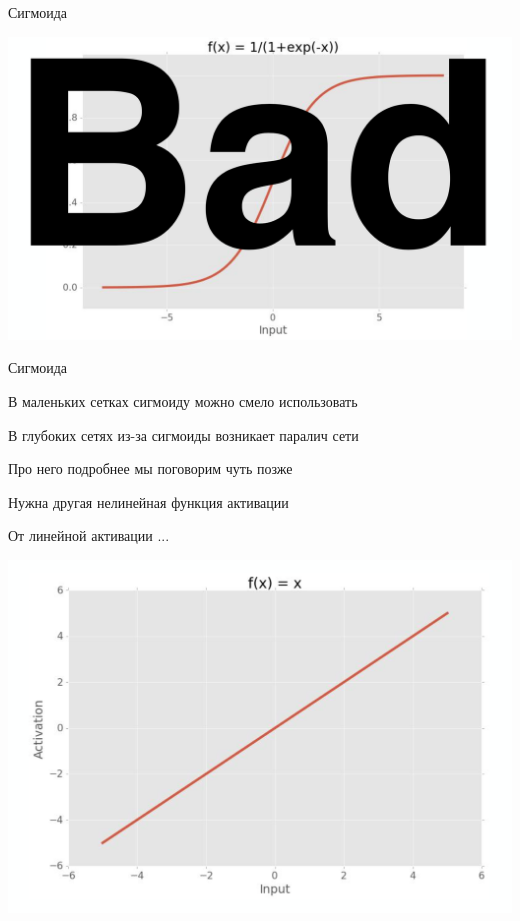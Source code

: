 \documentclass[notes,12pt, aspectratio=169]{beamer}
\newenvironment{wideitemize}{\itemize\addtolength{\itemsep}{10pt}}{\enditemize}
\begin{document}
\begin{frame}{Сигмоида}
\begin{center}
	\includegraphics[width=0.7\paperwidth]{activation_3.png}
\end{center}
\end{frame}


\begin{frame}{Сигмоида}
\begin{wideitemize}
	\item В маленьких сетках сигмоиду можно смело использовать
	\item В глубоких сетях из-за сигмоиды возникает \alert{паралич сети} 
	\item Про него подробнее мы поговорим чуть позже 
	\item Нужна другая нелинейная функция активации 
\end{wideitemize}
\end{frame}


\begin{frame}{От линейной активации ... }
\begin{center}
	\includegraphics[width=0.7\paperwidth]{activation_1.png}
\end{center}
\end{frame}
\end{document}
